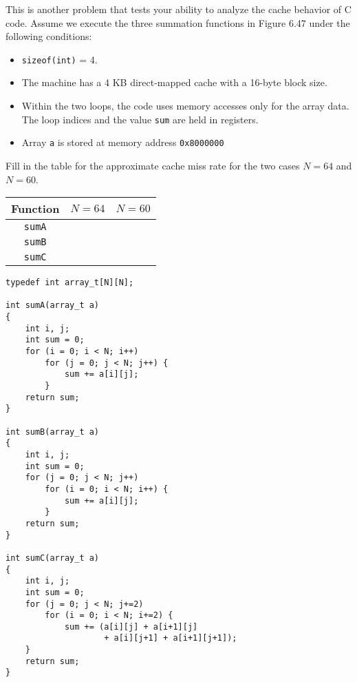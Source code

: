 \documentclass[12pt]{article}
\newenvironment{ex}[2][Exercise]{\begin{trivlist}
		\item[\hskip \labelsep {\bfseries #1}\hskip \labelsep {\bfseries #2.}]}{\end{trivlist}}
\begin{document}
\begin{ex}{6.37}
	This is another problem that tests your ability to analyze the cache behavior of C code. Assume we execute the
	three summation functions in Figure 6.47 under the following conditions:
	\begin{itemize}
		\item \texttt{sizeof(int)} = 4.
		\item The machine has a 4 KB direct-mapped cache with a 16-byte block size.
		\item Within the two loops, the code uses memory accesses only for the array data. The
		loop indices and the value \texttt{sum} are held in registers.
		\item Array \texttt{a} is stored at memory address \texttt{0x8000000}
	\end{itemize}
	Fill in the table for the approximate cache miss rate for the two cases $N=64$ and $N=60$.
	\begin{center}
		\begin{tabular}{ccc}
			Function & $N=64$ & $N=60$\\
			\hline
			\texttt{sumA} & \makebox[1cm]{\hrulefill} & \makebox[1cm]{\hrulefill}\\
			\texttt{sumB} & \makebox[1cm]{\hrulefill} & \makebox[1cm]{\hrulefill}\\
			\texttt{sumC} & \makebox[1cm]{\hrulefill} & \makebox[1cm]{\hrulefill}
		\end{tabular}
	\end{center}
	\begin{lstlisting}
typedef int array_t[N][N];

int sumA(array_t a)
{
	int i, j;
	int sum = 0;
	for (i = 0; i < N; i++)
		for (j = 0; j < N; j++) {
			sum += a[i][j];
		}
	return sum;
}

int sumB(array_t a)
{
	int i, j;
	int sum = 0;
	for (j = 0; j < N; j++)
		for (i = 0; i < N; i++) {
			sum += a[i][j];
		}
	return sum;
}

int sumC(array_t a)
{
	int i, j;
	int sum = 0;
	for (j = 0; j < N; j+=2)
		for (i = 0; i < N; i+=2) {
			sum += (a[i][j] + a[i+1][j]
					+ a[i][j+1] + a[i+1][j+1]);
	}
	return sum;
}
	\end{lstlisting}
\end{ex}
\end{document}
